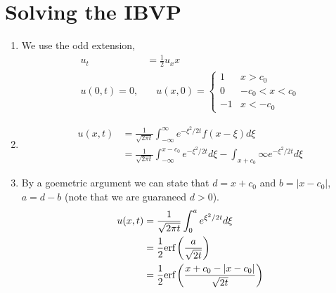 \documentclass{article}
\begin{document}
\section{Solving the IBVP}
    \begin{enumerate}[label=\roman*)]
        \item We use the odd extension, 
        \begin{align*}
            u_t &= \frac{1}{2}u_xx
            \\
            u(0,t) = 0, &\quad u(x,0) = \begin{cases}1 & x > c_0\\0 &
            -c_0<x<c_0\\ -1 & x < -c_0\end{cases}
        \end{align*}
        \item 
        \begin{align*}
            u(x,t) &= \frac{1}{\sqrt{2\pi t}} \int_{-\infty}^{\infty}
            e^{-\xi^2/2t} f(x-\xi)d\xi\\
            &= \frac{1}{\sqrt{2\pi t}} \int_{-\infty}^{x-c_0}
            e^{-\xi^2/2t}d\xi - \int_{x + c_0}{\infty}
            e^{-\xi^2/2t}d\xi
        \end{align*}
        \item 
            By a goemetric argument we can state that $d = x+c_0$ and $b =
            |x-c_0|$, $a = d-b$ (note that we are guaraneed $d > 0$). 
            \begin{align*}
                u(x,t) &= \frac{1}{\sqrt{2\pi t}} \int_0^a e^{\xi^2/2t}d\xi 
                \\
                &= \frac{1}{2}\text{erf}\left(\frac{a}{\sqrt{2t}}\right)
                \\
                &= \frac{1}{2}\text{erf}\left(\frac{x+c_0 - |x-c_0|}{\sqrt{2t}}\right)
            \end{align*}
    \end{enumerate}
\end{document}
